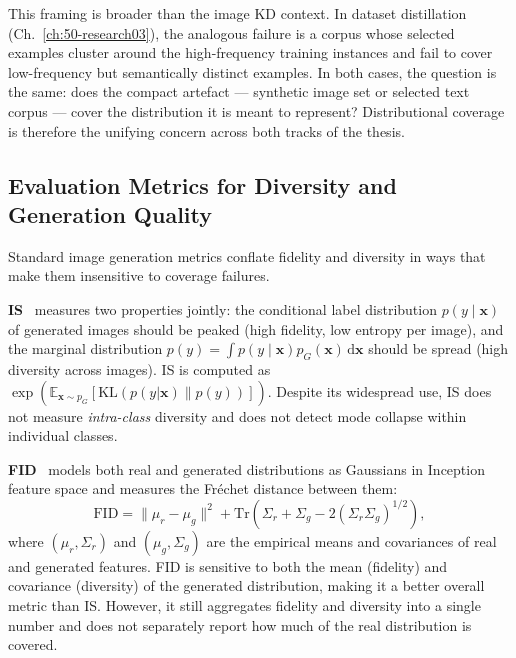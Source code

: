 \begin{foldable}
  This framing is broader than the image KD context.
  In dataset distillation (Ch.~\ref{ch:50-research03}), the analogous failure is a corpus whose selected examples cluster around the high-frequency training instances and fail to cover low-frequency but semantically distinct examples.
  In both cases, the question is the same: does the compact artefact --- synthetic image set or selected text corpus --- cover the distribution it is meant to represent?
  Distributional coverage is therefore the unifying concern across both tracks of the thesis.
\end{foldable}

\subsection{Evaluation Metrics for Diversity and Generation Quality}
\label{sec:25-background-synthetic-metrics}

\begin{foldable}
  Standard image generation metrics conflate fidelity and diversity in ways that make them insensitive to coverage failures.
\end{foldable}

\begin{foldable}
  \textbf{\ac{IS}}~\cite{salimans2016improved} measures two properties jointly: the conditional label distribution $p(y \mid \mathbf{x})$ of generated images should be peaked (high fidelity, low entropy per image), and the marginal distribution $p(y) = \int p(y \mid \mathbf{x}) p_G(\mathbf{x}) \, \mathrm{d}\mathbf{x}$ should be spread (high diversity across images).
  \ac{IS} is computed as $\exp(\mathbb{E}_{\mathbf{x} \sim p_G}[\mathrm{KL}(p(y|\mathbf{x}) \| p(y))])$.
  Despite its widespread use, \ac{IS} does not measure \emph{intra-class} diversity and does not detect mode collapse within individual classes.
\end{foldable}

\begin{foldable}
  \textbf{\ac{FID}}~\cite{heusel2017gans} models both real and generated distributions as Gaussians in Inception feature space and measures the Fréchet distance between them:
  \begin{equation}
    \mathrm{FID} = \|\mu_r - \mu_g\|^2 + \mathrm{Tr}\!\left(\Sigma_r + \Sigma_g
    - 2(\Sigma_r \Sigma_g)^{1/2}\right),
    \label{eq:fid}
  \end{equation}
  where $(\mu_r, \Sigma_r)$ and $(\mu_g, \Sigma_g)$ are the empirical means and covariances of real and generated features.
  \ac{FID} is sensitive to both the mean (fidelity) and covariance (diversity) of the generated distribution, making it a better overall metric than \ac{IS}.
  However, it still aggregates fidelity and diversity into a single number and does not separately report how much of the real distribution is covered.
\end{foldable}

